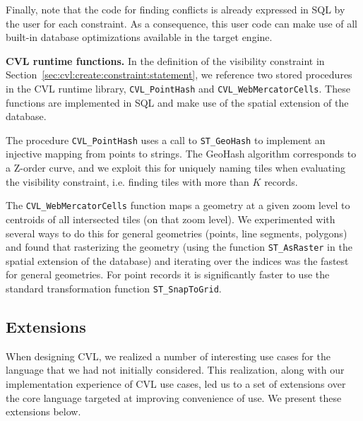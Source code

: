 \documentclass[11pt, oneside]{report}
\newcommand{\minisec}[1]{\noindent\textbf{#1.}}
\begin{document}
Finally, note that the code for finding conflicts is already expressed in SQL by the user for each constraint. As a consequence, this user code can make use of all built-in database optimizations available in the target engine.

\minisec{CVL runtime functions}
In the definition of the visibility constraint in Section~\ref{sec:cvl:create:constraint:statement}, we reference two stored procedures in the CVL runtime library, \texttt{CVL\_PointHash} and \texttt{CVL\_WebMercatorCells}. These functions are implemented in SQL and make use of the spatial extension of the database.

The procedure \texttt{CVL\_PointHash} uses a call to \texttt{ST\_GeoHash} to implement an injective mapping from points to strings. The GeoHash algorithm corresponds to a Z-order curve, and we exploit this for uniquely naming tiles when evaluating the visibility constraint, i.e. finding tiles with more than $K$ records.

The \texttt{CVL\_WebMercatorCells} function maps a geometry at a given zoom level to centroids of all intersected tiles (on that zoom level). We experimented with several ways to do this for general geometries (points, line segments, polygons) and found that rasterizing the geometry (using the function \texttt{ST\_AsRaster} in the spatial extension of the database) and iterating over the indices was the fastest for general geometries. For point records it is significantly faster to use the standard transformation function \texttt{ST\_SnapToGrid}.


\subsection{Extensions}
\label{sec:implementation:extensions}

When designing CVL, we realized a number of interesting use cases for the language that we had not initially considered. This realization, along with our implementation experience of CVL use cases, led us to a set of extensions over the core language targeted at improving convenience of use. We present these extensions below.
\end{document}
